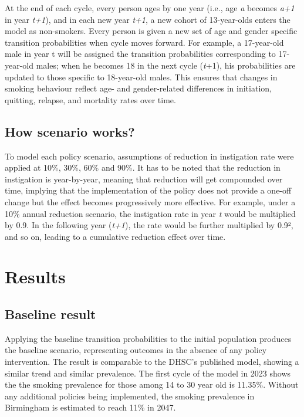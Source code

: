 \documentclass[
  letterpaper,
  DIV=11,
  numbers=noendperiod]{scrartcl}
\begin{document}
At the end of each cycle, every person ages by one year (i.e., age
\emph{a} becomes \emph{a+1} in year \emph{t+1}), and in each new year
\emph{t+1}, a new cohort of 13-year-olds enters the model as
non-smokers. Every person is given a new set of age and gender specific
transition probabilities when cycle moves forward. For example, a
17-year-old male in year t will be assigned the transition probabilities
corresponding to 17-year-old males; when he becomes 18 in the next cycle
(\emph{t}+1), his probabilities are updated to those specific to
18-year-old males. This ensures that changes in smoking behaviour
reflect age- and gender-related differences in initiation, quitting,
relapse, and mortality rates over time.

\subsection{How scenario works?}\label{how-scenario-works}

To model each policy scenario, assumptions of reduction in instigation
rate were applied at 10\%, 30\%, 60\% and 90\%. It has to be noted that
the reduction in instigation is year-by-year, meaning that reduction
will get compounded over time, implying that the implementation of the
policy does not provide a one-off change but the effect becomes
progressively more effective. For example, under a 10\% annual reduction
scenario, the instigation rate in year \emph{t} would be multiplied by
0.9. In the following year (\emph{t+1}), the rate would be further
multiplied by 0.9², and so on, leading to a cumulative reduction effect
over time.

\section{Results}\label{results}

\subsection{Baseline result}\label{baseline-result}

Applying the baseline transition probabilities to the initial population
produces the baseline scenario, representing outcomes in the absence of
any policy intervention. The result is comparable to the DHSC's
published model, showing a similar trend and similar prevalence. The
first cycle of the model in 2023 shows the the smoking prevalence for
those among 14 to 30 year old is 11.35\%. Without any additional
policies being implemented, the smoking prevalence in Birmingham is
estimated to reach 11\% in 2047.
\end{document}
